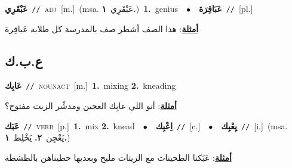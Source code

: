 \documentclass[10pt,a4paper,twoside]{article} %
\begin{document}
\begin{multicols}{2}
{\setlength\topsep{0pt}\textbf{\foreignlanguage{arabic}{عَبْقَرِي}}\ {\color{gray}\texttt{//}\color{black}}\ \textsc{adj}\ [m.]\ \color{gray}(msa. \foreignlanguage{arabic}{عَبْقَرِي}~\foreignlanguage{arabic}{\textbf{١.}})\color{black}\ \textbf{1.}~genius\ \ $\bullet$\ \ \setlength\topsep{0pt}\textbf{\foreignlanguage{arabic}{عَبَاقِرَة}}\ {\color{gray}\texttt{//}\color{black}}\ [pl.]\  \begin{flushright}\color{gray}\foreignlanguage{arabic}{\textbf{\underline{\foreignlanguage{arabic}{أمثلة}}}: هذا الصف أشطر صف بالمدرسة كل طلابه عَباقِرة}\end{flushright}\color{black}} \vspace{2mm}

\vspace{-3mm}
\subsection*{\color{blue}\foreignlanguage{arabic}{ع.ب.ك}\color{blue}{}} 

{\setlength\topsep{0pt}\textbf{\foreignlanguage{arabic}{عَابِك}}\ {\color{gray}\texttt{//}\color{black}}\ \textsc{noun\textunderscore act}\ [m.]\ \textbf{1.}~mixing  \textbf{2.}~kneading\  \begin{flushright}\color{gray}\foreignlanguage{arabic}{\textbf{\underline{\foreignlanguage{arabic}{أمثلة}}}: أنو اللي عابِك العجين ومدشِّر الزيت مفتوح؟}\end{flushright}\color{black}} \vspace{2mm}

{\setlength\topsep{0pt}\textbf{\foreignlanguage{arabic}{عَبَك}}\ {\color{gray}\texttt{//}\color{black}}\ \textsc{verb}\ [p.]\ \textbf{1.}~mix  \textbf{2.}~knead\ \ $\bullet$\ \ \setlength\topsep{0pt}\textbf{\foreignlanguage{arabic}{اِعْبِك}}\ {\color{gray}\texttt{//}\color{black}}\ [c.]\ \ $\bullet$\ \ \setlength\topsep{0pt}\textbf{\foreignlanguage{arabic}{يِعْبِك}}\ {\color{gray}\texttt{//}\color{black}}\ [i.]\ \color{gray}(msa. \foreignlanguage{arabic}{يَعْجِن}~\foreignlanguage{arabic}{\textbf{٢.}}  \foreignlanguage{arabic}{يَخْلِط}~\foreignlanguage{arabic}{\textbf{١.}})\color{black}\  \begin{flushright}\color{gray}\foreignlanguage{arabic}{\textbf{\underline{\foreignlanguage{arabic}{أمثلة}}}: عَبَكنا الطحينات مع الزيتات مليح وبعديها حطيناهن بالطشطة}\end{flushright}\color{black}} \vspace{2mm}


\end{multicols}
\end{document}
